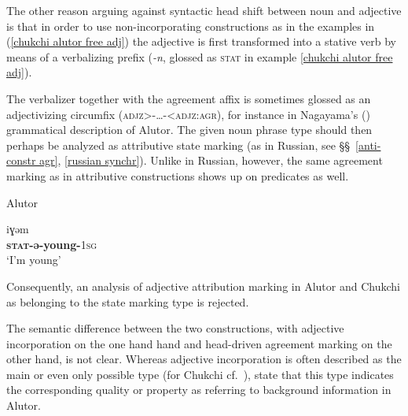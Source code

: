 The other reason arguing against syntactic head shift between noun and adjective is that in order to use non-incorporating constructions as in the examples in (\ref{chukchi alutor free adj}) the adjective is first transformed into a stative verb by means of a verbalizing prefix (\textit{-n}, glossed as \textsc{stat} in example \ref{chukchi alutor free adj}).

The verbalizer together with the agreement affix is sometimes glossed as an adjectivizing circumfix (\textsc{adjz>-\dots-<adjz:agr}), for instance in Nagayama's (\citeyear{nagayama2003}) grammatical description of Alutor. The given noun phrase type should then perhaps be analyzed as attributive state marking (as in Russian, see \S\S~\ref{anti-constr agr}, \ref{russian synchr}). Unlike in Russian, however, the same agreement marking as in attributive constructions shows up on predicates as well.
\begin{exe}
\ex \rm{Alutor \citep{nagayama2003}}
\begin{xlist}
\ex
{}iɣəm\\
	\textbf{\textsc{stat}-ə-young-}\textsc{1sg}\\
\glt	‘I'm young’
\end{xlist}
\end{exe}
Consequently, an analysis of adjective attribution marking in Alutor and Chukchi as belonging to the state marking type is rejected.

The semantic difference between the two constructions, with adjective incorporation on the one hand hand and head-driven agreement marking on the other hand, is not clear. Whereas adjective incorporation is often described as the main or even only possible type (for Chukchi cf.~\citealt[37, 101]{kampfe-etal1995}), \citet[288]{kibrik-etal2000} state that this type indicates the corresponding quality or property as referring to background information in Alutor.

